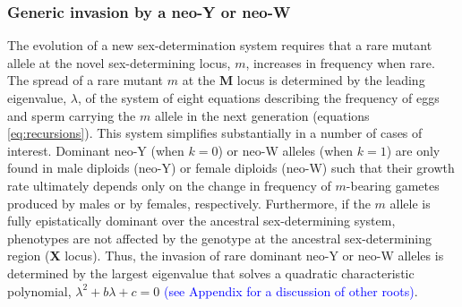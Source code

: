 \documentclass[12pt]{article}
\begin{document}

\subsubsection*{Generic invasion by a neo-Y or neo-W}

The evolution of a new sex-determination system requires that a rare mutant allele at the novel sex-determining locus, $m$, increases in frequency when rare. 
The spread of a rare mutant $m$ at the \textbf{M} locus is determined by the leading eigenvalue, $\lambda$, of the system of eight equations describing the frequency of eggs and sperm carrying the $m$ allele in the next generation (equations \ref{eq:recursions}). %
This system simplifies substantially in a number of cases of interest. 
Dominant neo-Y (when $k=0$) or neo-W alleles (when $k=1$) are only found in male diploids (neo-Y) or female diploids (neo-W) such that their growth rate ultimately depends only on the change in frequency of $m$-bearing gametes produced by males or by females, respectively. 
Furthermore, if the $m$ allele is fully epistatically dominant over the ancestral sex-determining system, phenotypes are not affected by the genotype at the ancestral sex-determining region (\textbf{X} locus). 
Thus, the invasion of rare dominant neo-Y or neo-W alleles is determined by the largest eigenvalue that solves a quadratic characteristic polynomial,
$\lambda^2+ b \lambda + c =0$ \textcolor{blue}{(see Appendix for a discussion of other roots)}.
%
\end{document}
